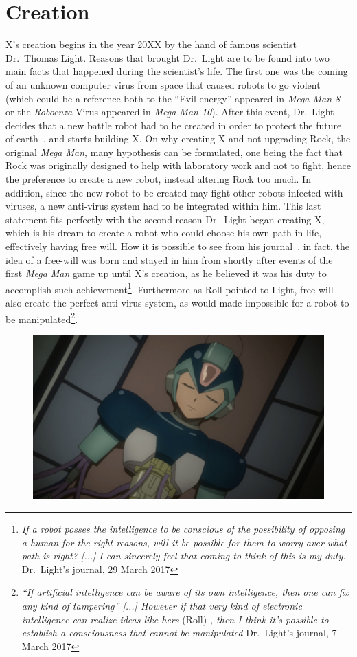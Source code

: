 \section{Creation}
X's creation begins in the year 20XX by the hand of famous scientist Dr.~Thomas Light. Reasons that brought Dr.~Light are to be found into two main facts that happened during the scientist's life. The first one was the coming of an unknown computer virus from space that caused robots to go violent (which could be a reference both to the ``Evil energy'' appeared in \emph{Mega Man 8} or the \textit{Roboenza} Virus appeared in \emph{Mega Man 10}). After this event, Dr.~Light decides that a new battle robot had to be created in order to protect the future of earth~\cite{mega_man_network:Zero_timeline}, and starts building X. On why creating X and not upgrading Rock, the original \textit{Mega Man}, many hypothesis can be formulated, one being the fact that Rock was originally designed to help with laboratory work and not to fight, hence the preference to create a new robot, instead altering Rock too much. In addition, since the new robot to be created may fight other robots infected with viruses, a new anti-virus system had to be integrated within him. This last statement fits perfectly with the second reason Dr.~Light began creating X, which is his dream to create a robot who could choose his own path in life, effectively having free will. How it is possible to see from his journal~\cite{Dr.Light_journal}, in fact, the idea of a free-will was born and stayed in him from shortly after events of the first \textit{Mega Man} game up until X's creation, as he believed it was his duty to accomplish such achievement\footnote{\textit{If a robot posses the intelligence to be conscious of the possibility of opposing a human for the right reasons, will it be possible for them to worry aver what path is right? [...] I can sincerely feel that coming to think of this is my duty.} Dr.~Light's journal, 29 March 2017}. Furthermore as Roll pointed to Light, free will also create the perfect anti-virus system, as would made impossible for a robot to be manipulated\footnote{\textit{``If artificial intelligence can be aware of its own intelligence, then one can fix any kind of tampering'' [...] However if that very kind of electronic intelligence can realize ideas like hers} (Roll) \textit{, then I think it's possible to establish a consciousness that cannot be manipulated} Dr.~Light's journal, 7 March 2017}. 
\begin{figure}[htp]
	\centering
	\includegraphics[width=0.7\linewidth]{figures/Characters/Char_X_build.jpg}
\end{figure}
